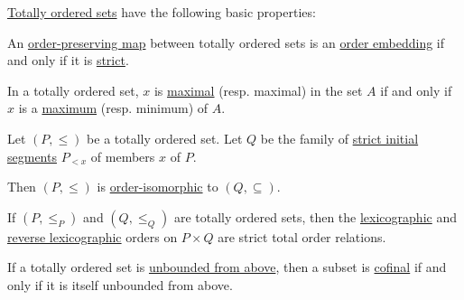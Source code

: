 \begin{proposition}\label{thm:def:totally_ordered_set}
  \hyperref[def:totally_ordered_set]{Totally ordered sets} have the following basic properties:
  \begin{thmenum}
     An \hyperref[def:order_function/preserving]{order-preserving map} between totally ordered sets is an \hyperref[def:preordered_set/homomorphism]{order embedding} if and only if it is \hyperref[def:order_function/preserving]{strict}.

     In a totally ordered set, \( x \) is \hyperref[def:extremal_points/maximal_and_minimal_element]{maximal} (resp. maximal) in the set \( A \) if and only if \( x \) is a \hyperref[def:extremal_points/maximum_and_minimum]{maximum} (resp. minimum) of \( A \).

     Let \( (P, \leq) \) be a totally ordered set. Let \( Q \) be the family of \hyperref[def:order_interval/unbounded]{strict initial segments} \( P_{<x} \) of members \( x \) of \( P \).

    Then \( (P, \leq) \) is \hyperref[def:preordered_set/homomorphism]{order-isomorphic} to \( (Q, \subseteq) \).

     If \( (P, \leq_P) \) and \( (Q, \leq_Q) \) are totally ordered sets, then the \hyperref[eq:def:lexicographic_order]{lexicographic} and \hyperref[eq:def:lexicographic_order/reverse]{reverse lexicographic} orders on \( P \times Q \) are strict total order relations.

     If a totally ordered set is \hyperref[def:extremal_points/bounds]{unbounded from above}, then a subset is \hyperref[def:cofinal_set]{cofinal} if and only if it is itself unbounded from above.
  \end{thmenum}
\end{proposition}
